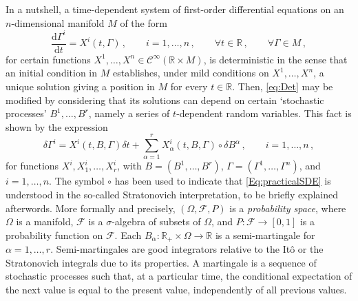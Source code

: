 \documentclass[11pt]{article}
\theoremstyle{plain}
\theoremstyle{definition}
\renewcommand{\d}{\mathrm{d}}
\newcommand{\Cinfty}{\mathscr{C}^\infty}
\def\d{\mathrm{d}}
\begin{document}
In a nutshell, a time-dependent system of first-order differential equations on an $n$-dimensional manifold $M$ of the form
\begin{equation}\label{eq:Det}
\frac{\d \Gamma^i}{\d t}=X^i(t,\Gamma)\,,\qquad i=1,\ldots,n\,,\qquad \forall t\in \mathbb{R}\,,\qquad \forall \Gamma\in M\,,
\end{equation}
for certain functions $X^1,\dotsc,X^n\in \Cinfty(\mathbb{R}\times M)$,
 is deterministic in the sense that an initial condition in $M$ establishes, under mild conditions on  $X^1,\ldots,X^n$, a unique solution giving a position in $M$ for every $t\in \mathbb{R}$. Then, \eqref{eq:Det} may be modified by considering that its solutions can depend on certain `stochastic processes' $B^1,\ldots,B^r$, namely a series of $t$-dependent random variables. This fact is shown by the expression
\begin{equation}\label{Eq:practicalSDE}
\delta \Gamma^i=X^i(t,B,\Gamma)\delta t+\sum_{\alpha=1}^rX^i_\alpha(t,B,\Gamma)\circ \delta B^\alpha\,,\qquad i=1,\ldots,n\,,
\end{equation}
for functions $X^i , X^i_1 ,\ldots,X_r^i $, with $B=(B^1,\ldots,B^r)$, $\Gamma=(\Gamma^1,\ldots,\Gamma^n)$, and $i=1,\ldots,n$. The symbol $\circ$ has been used to indicate that \eqref{Eq:practicalSDE} is understood in the so-called Stratonovich interpretation, to be briefly explained afterwords.
More formally and precisely, $(\Omega, \mathcal{F}, P)$ is a {\it probability space}, where $\Omega$ is a manifold, $\mathcal{F}$ is a $\sigma$-algebra of subsets of $\Omega$, and $P:\mathcal{F}\rightarrow [0,1]$ is a probability function on $\mathcal{F}$. Each $B_\alpha:\mathbb{R}_+\times\Omega\rightarrow \mathbb{R}$ is a semi-martingale for $\alpha=1,\ldots,r$. Semi-martingales are good integrators relative to the It\^{o} or the Stratonovich integrals due to its properties. %
A martingale  is a sequence of stochastic processes such that, at a particular time, the conditional expectation of the next value is equal to the present value, independently of all previous values.
\end{document}
